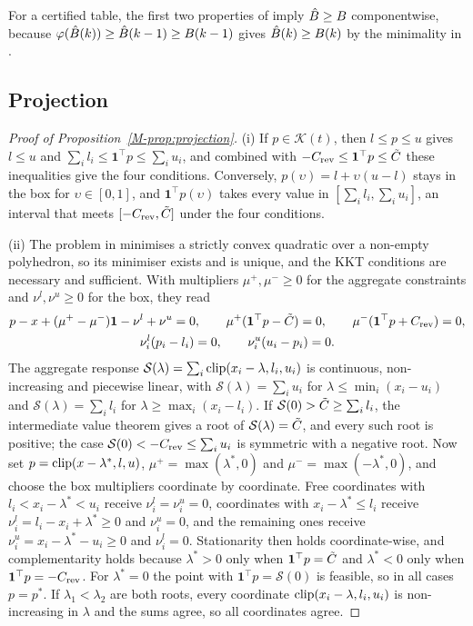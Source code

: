 For a certified table, the first two properties of  imply $\hat B\ge B$ componentwise, because $\varphi(\hat B(k))\ge\hat B(k-1)\ge B(k-1)$ gives $\hat B(k)\ge B(k)$ by the minimality in .

\subsection{Projection}\label{app:projection}

\begin{proof}[Proof of Proposition~\ref{M-prop:projection}]
(i) If $p\in\mathcal K(t)$, then $l\le p\le u$ gives $l\le u$ and $\sum_il_i\le\mathbf 1^\top p\le\sum_iu_i$, and combined with $-C_{\mathrm{rev}}\le\mathbf 1^\top p\le\tilde C$ these inequalities give the four conditions.
Conversely, $p(\upsilon)=l+\upsilon(u-l)$ stays in the box for $\upsilon\in[0,1]$, and $\mathbf 1^\top p(\upsilon)$ takes every value in $[\sum_il_i,\sum_iu_i]$, an interval that meets $[-C_{\mathrm{rev}},\tilde C]$ under the four conditions.

(ii) The problem in  minimises a strictly convex quadratic over a non-empty polyhedron, so its minimiser exists and is unique, and the KKT conditions are necessary and sufficient.
With multipliers $\mu^{+},\mu^{-}\ge0$ for the aggregate constraints and $\nu^{l},\nu^{u}\ge0$ for the box, they read
\[
\begin{gathered}
p-x+(\mu^{+}-\mu^{-})\mathbf 1-\nu^{l}+\nu^{u}=0,\qquad \mu^{+}(\mathbf 1^\top p-\tilde C)=0,\qquad \mu^{-}(\mathbf 1^\top p+C_{\mathrm{rev}})=0,\\
\nu^{l}_i(p_i-l_i)=0,\qquad \nu^{u}_i(u_i-p_i)=0.
\end{gathered}
\]
The aggregate response $\mathcal S(\lambda)=\sum_i\operatorname{clip}(x_i-\lambda,l_i,u_i)$ is continuous, non-increasing and piecewise linear, with $\mathcal S(\lambda)=\sum_iu_i$ for $\lambda\le\min_i(x_i-u_i)$ and $\mathcal S(\lambda)=\sum_il_i$ for $\lambda\ge\max_i(x_i-l_i)$.
If $\mathcal S(0)>\tilde C\ge\sum_il_i$, the intermediate value theorem gives a root of $\mathcal S(\lambda)=\tilde C$, and every such root is positive; the case $\mathcal S(0)<-C_{\mathrm{rev}}\le\sum_iu_i$ is symmetric with a negative root.
Now set $p=\operatorname{clip}(x-\lambda^{*},l,u)$, $\mu^{+}=\max(\lambda^{*},0)$ and $\mu^{-}=\max(-\lambda^{*},0)$, and choose the box multipliers coordinate by coordinate.
Free coordinates with $l_i<x_i-\lambda^{*}<u_i$ receive $\nu_i^{l}=\nu_i^{u}=0$, coordinates with $x_i-\lambda^{*}\le l_i$ receive $\nu_i^{l}=l_i-x_i+\lambda^{*}\ge0$ and $\nu_i^{u}=0$, and the remaining ones receive $\nu_i^{u}=x_i-\lambda^{*}-u_i\ge0$ and $\nu_i^{l}=0$.
Stationarity then holds coordinate-wise, and complementarity holds because $\lambda^{*}>0$ only when $\mathbf 1^\top p=\tilde C$ and $\lambda^{*}<0$ only when $\mathbf 1^\top p=-C_{\mathrm{rev}}$.
For $\lambda^{*}=0$ the point with $\mathbf 1^\top p=\mathcal S(0)$ is feasible, so in all cases $p=p^{*}$.
If $\lambda_1<\lambda_2$ are both roots, every coordinate $\operatorname{clip}(x_i-\lambda,l_i,u_i)$ is non-increasing in $\lambda$ and the sums agree, so all coordinates agree.
\end{proof}

